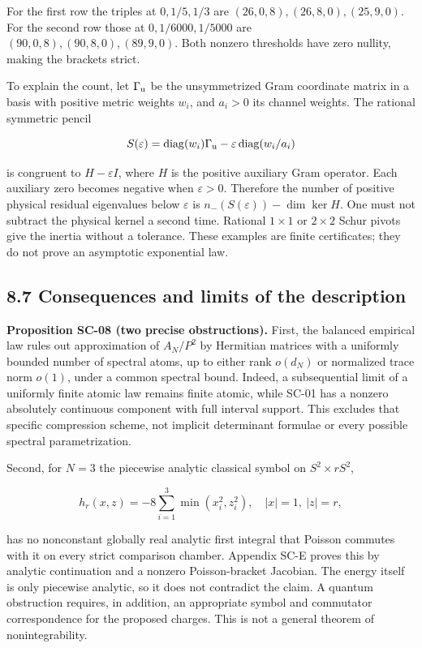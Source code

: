 For the first row the triples at \(0,1/5,1/3\) are \((26,0,8),(26,8,0),(25,9,0)\). For the second row those at \(0,1/6000,1/5000\) are \((90,0,8),(90,8,0),(89,9,0)\). Both nonzero thresholds have zero nullity, making the brackets strict.

To explain the count, let \(\Gamma_{\rm u}\) be the unsymmetrized Gram coordinate matrix in a basis with positive metric weights \(w_i\), and \(a_i>0\) its channel weights. The rational symmetric pencil

\[
S(\varepsilon)=\operatorname{diag}(w_i)\Gamma_{\rm u}
-\varepsilon\operatorname{diag}(w_i/a_i)
\]

is congruent to \(H-\varepsilon I\), where \(H\) is the positive auxiliary Gram operator. Each auxiliary zero becomes negative when \(\varepsilon>0\). Therefore the number of positive physical residual eigenvalues below \(\varepsilon\) is \(n_-(S(\varepsilon))-\dim\ker H\). One must not subtract the physical kernel a second time. Rational \(1\times1\) or \(2\times2\) Schur pivots give the inertia without a tolerance. These examples are finite certificates; they do not prove an asymptotic exponential law.

\hypertarget{consequences-and-limits-of-the-description}{%
\subsection{8.7 Consequences and limits of the description}\label{consequences-and-limits-of-the-description}}

\textbf{Proposition SC-08 (two precise obstructions).} First, the balanced empirical law rules out approximation of \(A_N/P^2\) by Hermitian matrices with a uniformly bounded number of spectral atoms, up to either rank \(o(d_N)\) or normalized trace norm \(o(1)\), under a common spectral bound. Indeed, a subsequential limit of a uniformly finite atomic law remains finite atomic, while SC-01 has a nonzero absolutely continuous component with full interval support. This excludes that specific compression scheme, not implicit determinant formulae or every possible spectral parametrization.

Second, for \(N=3\) the piecewise analytic classical symbol on \(S^2\times rS^2\),

\[
h_r(x,z)=-8\sum_{i=1}^3\min(x_i^2,z_i^2),
\quad |x|=1,\ |z|=r,
\]

has no nonconstant globally real analytic first integral that Poisson commutes with it on every strict comparison chamber. Appendix SC-E proves this by analytic continuation and a nonzero Poisson-bracket Jacobian. The energy itself is only piecewise analytic, so it does not contradict the claim. A quantum obstruction requires, in addition, an appropriate symbol and commutator correspondence for the proposed charges. This is not a general theorem of nonintegrability.


